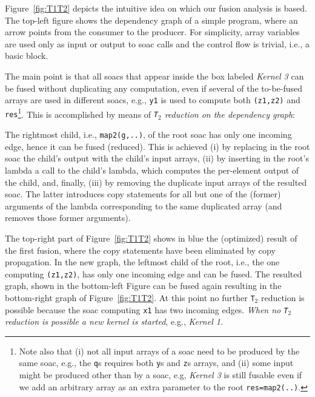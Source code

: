 \documentclass{sigplanconf}  %
\newcommand{\emp}[1]{\textcolor{DikuRed}{ #1}}
\begin{document}
Figure~\ref{fig:T1T2} depicts the intuitive idea on which
our fusion analysis is based.   The top-left figure shows
the dependency graph of a simple program, where an 
arrow points from the consumer to the producer. 
%
For simplicity, array variables are used only as input or 
output to {\sc soac} calls and the control flow is trivial,
i.e., a basic block. 

The main point is that all {\sc soac}s that appear inside the box
labeled \emp{\em Kernel 3} can be fused without duplicating any
computation, even if several of the to-be-fused 
arrays are used in different {\sc soac}s, e.g., {\tt y1} is used to
compute both {\tt (z1,z2)} and {\tt res}\footnote{
Note also that (i) not all input arrays of a {\sc soac} need to be produced
by the same {\sc soac}, e.g., the {\tt q}s requires both {\tt y}s and 
{\tt z}s arrays, and (ii) some input might be produced other than 
by a {\sc soac}, e.g, \emp{\em Kernel 3} is still fusable even if 
we add an arbitrary array as an extra parameter to the root {\tt res=map2(..)}. 
}. 
This is accomplished by means of {\em {\tt T$_2$} reduction on the dependency graph}:

The rightmost child, i.e., {\tt map2(g,..)}, of the root {\sc soac} 
has only one incoming edge, 
hence it can be fused (reduced). This is achieved  (i) by replacing in
the root {\sc soac} the child's output with the child's input arrays, 
(ii) by inserting in the root's lambda a call to the child's lambda,
which computes the per-element output of the child, %
and, finally, (iii) by removing the duplicate input arrays of the resulted {\sc soac}.
The latter introduces copy statements for all but one 
of the (former) arguments of the lambda corresponding to the same duplicated
array (and removes those former arguments).


The top-right part of Figure~\ref{fig:T1T2} shows in blue the (optimized) 
result of the first fusion, where the copy statements have been eliminated 
by copy propagation.   In the new graph, the leftmost child of the root, 
i.e., the one computing {\tt (z1,z2)}, has only one incoming edge 
and can be fused.  The resulted graph, shown in the bottom-left Figure
can be fused again resulting in the bottom-right graph of Figure~\ref{fig:T1T2}.
At this point no further {\tt T}$_2$ reduction is possible because
the {\sc soac} computing {\tt x1} has two incoming edges. 
%
{\em When no {\tt T}$_2$ reduction is possible a new kernel is started}, 
e.g., \emp{\em Kernel 1}.
\end{document}
